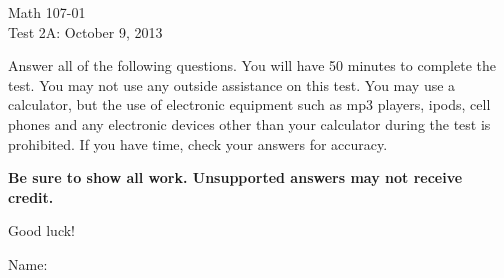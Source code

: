 \documentclass[12pt]{article}
\begin{document}
\pagestyle{empty}


\begin{center}
\begin{large}
Math 107-01\\
Test 2A: October 9, 2013
\end{large}
\end{center}

\begin{small} Answer all of the following questions.  You will have 50 minutes to complete the
test. You may not use any outside assistance on this test.  You may use a
calculator, but the use of
electronic equipment such as mp3 players, ipods, cell phones and any
electronic devices other than your calculator during the test is
prohibited.  If you have time, check your answers for accuracy.

\textbf{Be sure to show all work. Unsupported answers may not
receive credit.}

Good luck!\end{small}


\vspace{ .15 in}
Name: \underline{\qquad \qquad \qquad \qquad \qquad \qquad \qquad \qquad \qquad \qquad}\\
\end{document}
